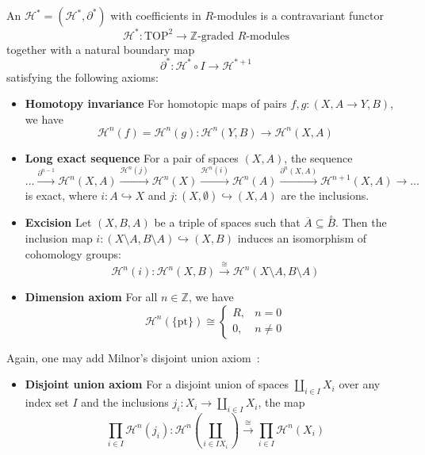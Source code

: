 \documentclass[a4paper,12pt]{article}
\begin{document}
\begin{definition}
    An  \(\mathcal{H}^\ast=(\mathcal{H}^\ast,\partial^\ast)\) with coefficients in \(R\)-modules is a contravariant functor \[\mathcal{H}^\ast:\mathrm{TOP}^2\to\mathbb{Z}\text{-graded }R\text{-modules}\] together with a natural boundary map
    \[\partial^\ast:\mathcal{H}^\ast\circ I\to\mathcal{H}^{\ast+1}\] satisfying the following axioms:
    \begin{itemize}
        \item \textbf{Homotopy invariance} For homotopic maps of pairs \(f,g:(X,A\to Y,B)\), we have \[\mathcal{H}^n(f)=\mathcal{H}^n(g):\mathcal{H}^n(Y,B)\to\mathcal{H}^n(X,A)\]
        \item \textbf{Long exact sequence} For a pair of spaces \((X,A)\), the sequence \[\dots\xrightarrow{\partial^{n-1}}\mathcal{H}^n(X,A)\xrightarrow{\mathcal{H}^n(j)}\mathcal{H}^n(X)\xrightarrow{\mathcal{H}^n(i)}\mathcal{H}^n(A)\xrightarrow{\partial^n(X,A)}\mathcal{H}^{n+1}(X,A)\rightarrow\dots\] is exact, where \(i:A\hookrightarrow X\) and \(j:(X,\emptyset)\hookrightarrow (X,A)\) are the inclusions.
        \item \textbf{Excision} Let \((X,B,A)\) be a triple of spaces such that \(\overline{A}\subseteq\overset{\circ}{B}\). Then the inclusion map \(i:(X\setminus A,B\setminus A)\hookrightarrow(X,B)\) induces an isomorphism of cohomology groups: \[\mathcal{H}^n(i):\mathcal{H}^n(X,B)\xrightarrow{\cong}\mathcal{H}^n(X\setminus A, B\setminus A)\]
        \item \textbf{Dimension axiom}
        For all \(n\in\mathbb{Z}\), we have \[\mathcal{H}^n(\{\mathrm{pt}\})\cong\begin{cases} R, & n=0\\ 0, & n\neq0\end{cases}\]
    \end{itemize}
    Again, one may add Milnor's disjoint union axiom\ \cite[p.337,Additivity Axiom]{milnor}:
    \begin{itemize}
        \item \textbf{Disjoint union axiom}
        For a disjoint union of spaces \(\coprod_{i\in I}X_i\) over any index set \(I\) and the inclusions \(j_i:X_i\to\coprod_{i\in I}X_i\), the map
        \[\prod_{i\in I}\mathcal{H}^n(j_i):\mathcal{H}^n\left(\coprod_{i\in I X_i}\right)\xrightarrow{\cong}\prod_{i\in I}\mathcal{H}^n(X_i)\]
    \end{itemize}
\end{definition}
\end{document}
